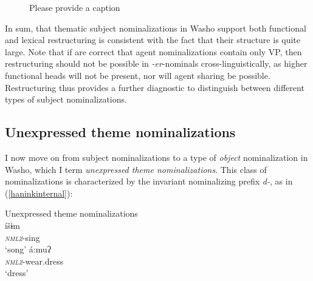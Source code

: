 \documentclass[output=paper]{langscibook}
\begin{document}
\begin{figure}
\caption{\color{red}Please provide a caption\label{fig:haninksubjectstructure}}
 \end{figure}

In sum, that thematic subject nominalizations in Washo support both functional and lexical restructuring is consistent with the fact that their structure is quite large. Note that if  \citet{bakervinokurova2009} are correct that agent nominalizations contain only VP, then restructuring should not be possible in {\itshape -er}-nominals cross-linguistically, as higher functional heads will not be present, nor will agent sharing be possible. Restructuring thus provides a further diagnostic to distinguish between different types of subject nominalizations.
 

\subsection{Unexpressed theme nominalizations}

I now move on from subject nominalizations to a type of {\itshape object} nominalization in Washo, which I term {\itshape unexpressed theme nominalizations}. This class of nominalizations is characterized by the invariant nominalizing prefix {\itshape d-}, as in (\ref{haninkinternal}): 

\ea Unexpressed theme nominalizations\label{haninkinternal}\\
\ea {}íšɨm\\
\textit{\textsc{nmlz}}-sing\\
\glt `song'
\ex {}á:muʔ\\
\textit{\textsc{nmlz}}-wear.dress\\
\glt `dress' 
\z
\z 
\end{document}
